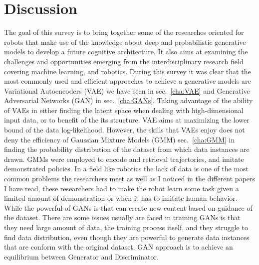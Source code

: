 

\pagestyle{fancy} 
\chapter{Discussion}
\label{cha:3}
\vspace{1cm}

The goal of this survey is to bring together some of the researches oriented for robots that make use of the knowledge about deep and probabilistic generative models to develop a future cognitive architecture. It also aims at examining the challenges and opportunities emerging from the interdisciplinary research field covering machine learning, and robotics. During this survey it was clear that the most commonly used and efficient approaches to achieve a generative models are Variational Autoencoders (VAE) we have seen in sec.~\ref{cha:VAE} and Generative Adversarial Networks (GAN) in sec.~\ref{cha:GANs}. Taking advantage of the ability of VAEs in either finding the latent space when dealing with high-dimensional input data, or to benefit of the its structure. VAE aims at maximizing the lower bound of the data log-likelihood. However, the skills that VAEs enjoy does not deny the efficiency of Gaussian Mixture Models (GMM) sec.~\ref{cha:GMM} in finding the probability distribution of the dataset from which data instances are drawn. GMMs were employed to encode and retrieval trajectories, and imitate demonstrated policies. In a field like robotics the lack of data is one of the most common problems the researchers meet as well as I noticed in the different papers I have read, these researchers had to make the robot learn some task given a limited amount of demonstration or when it has to imitate human behavior. While the powerful of GANs is that can create new content based on guidance of the dataset. There are some issues usually are faced in training GANs is that they need large amount of data,  the training process itself, and they struggle to find data distribution, even though they are powerful to generate data instances that are conform with the original dataset. GAN approach is to achieve an equilibrium between Generator and Discriminator.  
